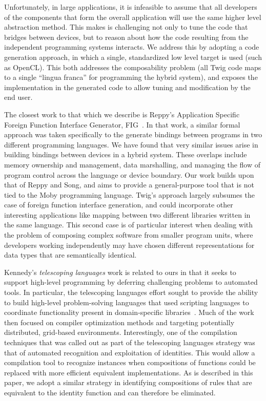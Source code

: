 Unfortunately, in large applications, it is infeasible to assume that
all developers of the components that form the overall application
will use the same higher level abstraction method. This makes is
challenging not only to tune the code that bridges between devices,
but to reason about how the code resulting from the independent
programming systems interacts. We address this by adopting a code
generation approach, in which a single, standardized low level target
is used (such as OpenCL). This both addresses the composability
problem (all Twig code maps to a single ``lingua franca'' for
programming the hybrid system), and exposes the implementation in the
generated code to allow tuning and modification by the end user.

The closest work to that which we describe is Reppy's Application
Specific Foreign Function Interface Generator,
FIG~\cite{reppy06fig}. In that work, a similar formal approach was
taken specifically to the generate bindings between programs in two
different programming languages. We have found that very similar
issues arise in building bindings between devices in a hybrid
system. These overlaps include memory ownership and management, data
marshalling, and managing the flow of program control across the
language or device boundary. Our work builds upon that of Reppy and
Song, and aims to provide a general-purpose tool that is not tied to
the Moby programming language. Twig's approach largely subsumes the
case of foreign function interface generation, and could incorporate
other interesting applications like mapping between two different
libraries written in the same language. This second case is of
particular interest when dealing with the problem of composing complex
software from smaller program units, where developers working
independently may have chosen different representations for data types
that are semantically identical.

Kennedy's \emph{telescoping languages} work is related to ours in that
it seeks to support high-level programming by deferring challenging
problems to automated tools. In particular, the telescoping languages
effort sought to provide the ability to build high-level
problem-solving languages that used scripting languages to coordinate
functionality present in domain-specific
libraries~\cite{kennedy00telescoping}. Much of the work then focused
on compiler optimization methods and targeting potentially
distributed, grid-based environments. Interestingly, one of the
compilation techniques that was called out as part of the telescoping
languages strategy was that of automated recognition and exploitation
of identities. This would allow a compilation tool to recognize
instances when compositions of functions could be replaced with more
efficient equivalent implementations. As is described in this paper,
we adopt a similar strategy in identifying compositions of rules that
are equivalent to the identity function and can therefore be
eliminated.

